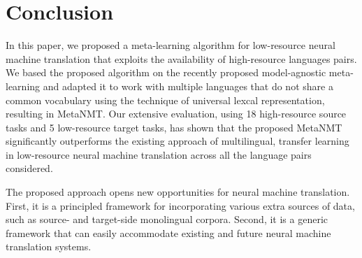 


\section{Conclusion}

In this paper, we proposed a meta-learning algorithm for low-resource neural machine translation that exploits the availability of high-resource languages pairs. We based the proposed algorithm on the recently proposed model-agnostic meta-learning and adapted it to work with multiple languages that do not share a common vocabulary using the technique of universal lexcal representation, resulting in MetaNMT. Our extensive evaluation, using 18 high-resource source tasks and 5 low-resource target tasks, has shown that the proposed MetaNMT significantly outperforms the existing approach of multilingual, transfer learning in low-resource neural machine translation across all the language pairs considered.

The proposed approach opens new opportunities for neural machine translation. First, it is a principled framework for incorporating various extra sources of data, such as source- and target-side monolingual corpora. Second, it is a generic framework that can easily accommodate existing and future neural machine translation systems. 
